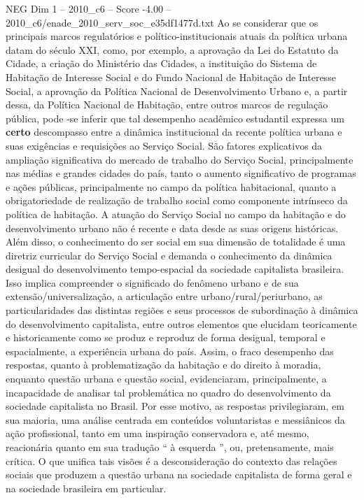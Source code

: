 \begin{textsample}{NEG Dim 1 – 2010\_c6 – Score -4.00 – 2010\_c6/enade\_2010\_serv\_soc\_e35df1477d.txt}
Ao se considerar que os principais marcos regulatórios e político-institucionais atuais da política urbana datam do século XXI, como, por exemplo, a aprovação da Lei do Estatuto da Cidade, a criação do Ministério das Cidades, a instituição do Sistema de Habitação de Interesse Social e do Fundo Nacional de Habitação de Interesse Social, a aprovação da Política Nacional de Desenvolvimento Urbano e, a partir dessa, da Política Nacional de Habitação, entre outros marcos de regulação pública, pode -se inferir que tal desempenho acadêmico estudantil expressa um \textbf{certo} descompasso entre a dinâmica institucional da recente política urbana e suas exigências e requisições ao Serviço Social.
São fatores explicativos da ampliação significativa do mercado de trabalho do Serviço Social, principalmente nas médias e grandes cidades do país, tanto o aumento significativo de programas e ações públicas, principalmente no campo da política habitacional, quanto a obrigatoriedade de realização de trabalho social como componente intrínseco da política de habitação.
A atuação do Serviço Social no campo da habitação e do desenvolvimento urbano não é recente e data desde as suas origens históricas.
Além disso, o conhecimento do ser social em sua dimensão de totalidade é uma diretriz curricular do Serviço Social e demanda o conhecimento da dinâmica desigual do desenvolvimento tempo-espacial da sociedade capitalista brasileira.
Isso implica compreender o significado do fenômeno urbano e de sua extensão/universalização, a articulação entre urbano/rural/periurbano, as particularidades das distintas regiões e seus processos de subordinação à dinâmica do desenvolvimento capitalista, entre outros elementos que elucidam teoricamente e historicamente como se produz e reproduz de forma desigual, temporal e espacialmente, a experiência urbana do país.
Assim, o fraco desempenho das respostas, quanto à problematização da habitação e do direito à moradia, enquanto questão urbana e questão social, evidenciaram, principalmente, a incapacidade de analisar tal problemática no quadro do desenvolvimento da sociedade capitalista no Brasil.
Por esse motivo, as respostas privilegiaram, em sua maioria, uma análise centrada em conteúdos voluntaristas e messiânicos da ação profissional, tanto em uma inspiração conservadora e, até mesmo, reacionária quanto em sua tradução “ à esquerda ”, ou, pretensamente, mais crítica.
O que unifica tais visões é a desconsideração do contexto das relações sociais que produzem a questão urbana na sociedade capitalista de forma geral e na sociedade brasileira em particular.

\end{textsample}
